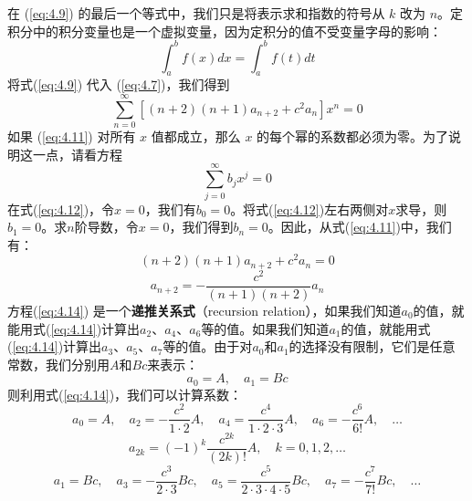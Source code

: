     在 (\ref{eq:4.9}) 的最后一个等式中，我们只是将表示求和指数的符号从 $k$ 改为 $n$。定积分中的积分变量也是一个虚拟变量，因为定积分的值不受变量字母的影响：
    \begin{equation}
        \int_{a}^{b}f\left(x\right)dx = \int_{a}^{b}f\left(t\right)dt
        \label{eq:4.10}
    \end{equation}
    将式(\ref{eq:4.9}) 代入 (\ref{eq:4.7})，我们得到
    \begin{equation}
        \sum_{n=0}^{\infty}\left[\left(n+2\right)\left(n+1\right)a_{n+2}+c^2a_n\right]x^n = 0
        \label{eq:4.11}
    \end{equation}
    如果 (\ref{eq:4.11}) 对所有 $x$ 值都成立，那么 $x$ 的每个幂的系数都必须为零。为了说明这一点，请看方程
    \begin{equation}
        \sum_{j=0}^{\infty}b_jx^j = 0
        \label{eq:4.12}
    \end{equation}
    在式(\ref{eq:4.12})，令$x=0$，我们有$b_0=0$。将式(\ref{eq:4.12})左右两侧对$x$求导，则$b_1=0$。求$n$阶导数，令$x=0$，我们得到$b_n=0$。因此，从式(\ref{eq:4.11})中，我们有：
    \begin{equation}
        \left(n+2\right)\left(n+1\right)a_{n+2} + c^2 a_n = 0
        \label{eq:4.13}
    \end{equation}
    \begin{equation}
        a_{n+2} = -\frac{c^2}{\left(n+1\right)\left(n+2\right)}a_n
        \label{eq:4.14}
    \end{equation}
    方程(\ref{eq:4.14}) 是一个\textbf{递推关系式}（recursion relation），如果我们知道$a_0$的值，就能用式(\ref{eq:4.14})计算出$a_2$、$a_4$、$a_6$等的值。如果我们知道$a_1$的值，就能用式(\ref{eq:4.14})计算出$a_3$、$a_5$、$a_7$等的值。由于对$a_0$和$a_1$的选择没有限制，它们是任意常数，我们分别用$A$和$Bc$来表示：
    \begin{equation}
        a_0 = A, \quad a_1 = Bc
        \label{eq:4.15}
    \end{equation}
    则利用式(\ref{eq:4.14})，我们可以计算系数：
    \begin{equation*}
        a_0 = A, \quad a_2 = -\frac{c^2}{1 \cdot 2}A, \quad a_4 = \frac{c^4}{1 \cdot 2\cdot 3}A, \quad a_6 = -\frac{c^6}{6!}A, \quad \ldots
    \end{equation*}
    \begin{equation}
        a_{2k} = (-1)^k \frac{c^{2k}}{(2k)!}A, \quad k = 0, 1, 2, \ldots
        \label{eq:4.16}
    \end{equation}
    \begin{equation*}
        a_1 = Bc, \quad a_3 = -\frac{c^3}{2 \cdot 3}Bc, \quad a_5 = \frac{c^5}{2 \cdot 3 \cdot 4 \cdot 5}Bc, \quad a_7 = -\frac{c^7}{7!}Bc, \quad \ldots
    \end{equation*}

